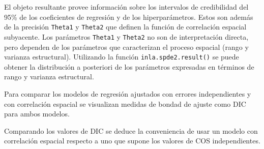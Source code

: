 \documentclass[11pt,b5paper,]{krantz}
\newenvironment{Shaded}{}{}
\newcommand{\KeywordTok}[1]{\textcolor[rgb]{0.00,0.44,0.13}{\textbf{#1}}}
\newcommand{\DataTypeTok}[1]{\textcolor[rgb]{0.56,0.13,0.00}{#1}}
\newcommand{\DecValTok}[1]{\textcolor[rgb]{0.25,0.63,0.44}{#1}}
\newcommand{\StringTok}[1]{\textcolor[rgb]{0.25,0.44,0.63}{#1}}
\newcommand{\CommentTok}[1]{\textcolor[rgb]{0.38,0.63,0.69}{\textit{#1}}}
\newcommand{\ControlFlowTok}[1]{\textcolor[rgb]{0.00,0.44,0.13}{\textbf{#1}}}
\newcommand{\OperatorTok}[1]{\textcolor[rgb]{0.40,0.40,0.40}{#1}}
\newcommand{\NormalTok}[1]{#1}
\begin{document}
El objeto resultante provee información sobre los intervalos de
credibilidad del 95\% de los coeficientes de regresión y de los
hiperparámetros. Estos son además de la precisión \texttt{Theta1} y
\texttt{Theta2} que definen la función de correlación espacial
subyacente. Los parámetros \texttt{Theta1} y \texttt{Theta2} no son de
interpretación directa, pero dependen de los parámetros que caracterizan
el proceso espacial (rango y varianza estructural). Utilizando la
función \texttt{inla.spde2.result()} se puede obtener la distribución a
posteriori de los parámetros expresadas en términos de rango y varianza
estructural.

\begin{Shaded}
\end{Shaded}

Para comparar los modelos de regresión ajustados con errores
independientes y con correlación espacial se visualizan medidas de
bondad de ajuste como DIC para ambos modelos.

\begin{Shaded}
\end{Shaded}

Comparando los valores de DIC se deduce la conveniencia de usar un
modelo con correlación espacial respecto a uno que supone los valores de
COS independientes.
\end{document}

